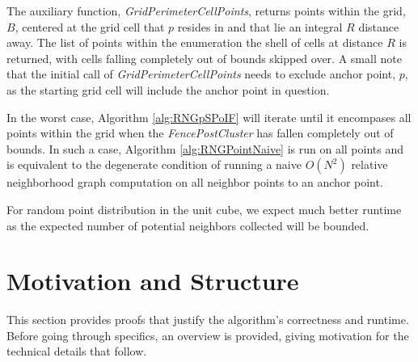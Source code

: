 \documentclass[a4paper,fleqn]{cas-dc}
\begin{document}
%

The auxiliary function, \emph{GridPerimeterCellPoints},
returns points within the grid, $B$,
centered at the grid cell that $p$ resides in and that lie an integral $R$ distance away.
The list of points within the enumeration the shell of cells at distance $R$ is returned, with cells
falling completely out of bounds skipped over.
A small note that the initial call of \emph{GridPerimeterCellPoints} needs to exclude anchor point,
$p$, as the starting grid cell will include the anchor point in question.

In the worst case, Algorithm \ref{alg:RNGpSPoIF} will iterate until it encompases all points within the grid
when the \emph{FencePostCluster}
has fallen completely out of bounds.
In such a case, Algorithm \ref{alg:RNGPointNaive} is run on all points and is equivalent to the degenerate
condition of running a naive $O(N^2)$ relative neighborhood graph computation on all neighbor points to an
anchor point.

For random point distribution in the unit cube, we expect much better runtime as the expected
number of potential neighbors collected will be bounded.


\section{Motivation and Structure}

This section provides proofs that justify the algorithm's correctness and runtime.
Before going through specifics, an overview is provided, giving motivation
for the technical details that follow.
\end{document}
